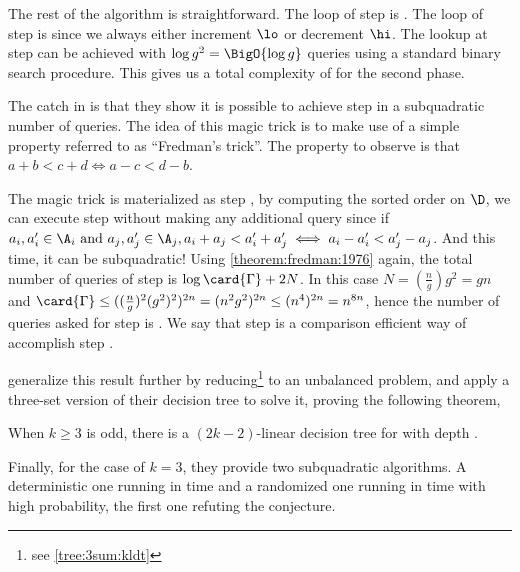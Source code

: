 The rest of the algorithm is straightforward. The loop of step  is
. The loop of step  is  since we
always either increment $\lo$ or decrement $\hi$. The lookup at step
 can be achieved with $\log g^2 = \BigO{\log g}$ queries using
a standard binary search procedure. This gives us a total complexity of
 for the second phase.

The catch in \cite{gronlund:2014} is that they show it is possible to
achieve step  in a subquadratic number of queries. The idea of this
magic trick is to make use of a simple property referred to as ``Fredman's
trick''. The property to observe is that $a + b < c + d \iff a - c < d - b$.

The magic trick is materialized as step , by computing the sorted
order on $\D$, we can execute step  without making any additional
query since if $a_i, a_i' \in \A_i \text{ and } a_j, a_j' \in \A_j, a_i + a_j <
a_i' + a_j' \iff a_i - a_i' < a_j' - a_j$. And this time, it can be
subquadratic! Using \ref{theorem:fredman:1976} again, the total number of
queries of step  is $\log \card{\Gamma} + 2N$. In this case $N =
(\frac{n}{g}) g^2 = gn$ and $\card{\Gamma} \le ((\frac{n}{g})^2 (g^2)^2)^{2n} =
(n^2 g^2)^{2n} \le (n^4)^{2n} = n^{8n}$, hence the number of queries asked for
step  is . We say that step  is a
comparison efficient way of accomplish step .

\citet*{gronlund:2014} generalize this result further by reducing\footnote{see
\ref{tree:3sum:kldt}} \kLDT to an unbalanced \threeSUM problem, and apply a
three-set version of their decision tree to solve it, proving the following
theorem,

\begin{theorem}
When $k \ge 3$ is odd, there is a $(2k-2)$-linear decision tree for \kLDT with
depth .
\end{theorem}

Finally, for the case of $k = 3$, they provide two subquadratic \threeSUM
algorithms. A deterministic one running in  time and a randomized one running in  time with high probability, the first one refuting the \threeSUM
conjecture.
